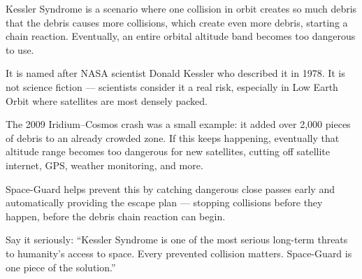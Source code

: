 \documentclass[11pt,a4paper]{article}
\begin{document}
\begin{answerbox}
Kessler Syndrome is a scenario where one collision in orbit creates so much debris that the debris causes more collisions, which create even more debris, starting a chain reaction. Eventually, an entire orbital altitude band becomes too dangerous to use.

It is named after NASA scientist Donald Kessler who described it in 1978. It is not science fiction --- scientists consider it a real risk, especially in Low Earth Orbit where satellites are most densely packed.

The 2009 Iridium--Cosmos crash was a small example: it added over 2,000 pieces of debris to an already crowded zone. If this keeps happening, eventually that altitude range becomes too dangerous for new satellites, cutting off satellite internet, GPS, weather monitoring, and more.

Space-Guard helps prevent this by catching dangerous close passes early and automatically providing the escape plan --- stopping collisions before they happen, before the debris chain reaction can begin.
\end{answerbox}

\begin{tipbox}
Say it seriously: ``Kessler Syndrome is one of the most serious long-term threats to humanity's access to space. Every prevented collision matters. Space-Guard is one piece of the solution.''
\end{tipbox}
\end{document}
